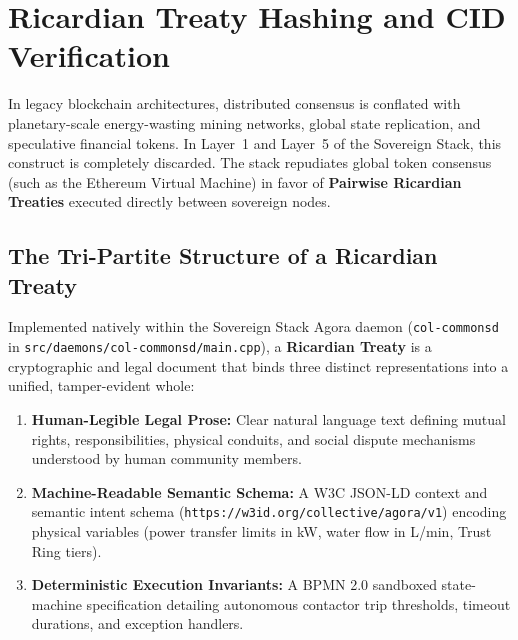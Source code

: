 \begin{enumerate}
\end{enumerate}

\section{Ricardian Treaty Hashing and CID Verification}
\label{sec:ricardian_treaties}

In legacy blockchain architectures, distributed consensus is conflated with planetary-scale energy-wasting mining networks, global state replication, and speculative financial tokens. In Layer~1 and Layer~5 of the Sovereign Stack, this construct is completely discarded. The stack repudiates global token consensus (such as the Ethereum Virtual Machine) in favor of \textbf{Pairwise Ricardian Treaties} executed directly between sovereign nodes.

\subsection{The Tri-Partite Structure of a Ricardian Treaty}
Implemented natively within the Sovereign Stack Agora daemon (\texttt{col-commonsd} in \texttt{src/daemons/col-commonsd/main.cpp}), a \textbf{Ricardian Treaty} is a cryptographic and legal document that binds three distinct representations into a unified, tamper-evident whole:
\begin{enumerate}
    \item \textbf{Human-Legible Legal Prose:} Clear natural language text defining mutual rights, responsibilities, physical conduits, and social dispute mechanisms understood by human community members.
    \item \textbf{Machine-Readable Semantic Schema:} A W3C JSON-LD context and semantic intent schema (\texttt{https://w3id.org/collective/agora/v1}) encoding physical variables (power transfer limits in kW, water flow in L/min, Trust Ring tiers).
    \item \textbf{Deterministic Execution Invariants:} A BPMN 2.0 sandboxed state-machine specification detailing autonomous contactor trip thresholds, timeout durations, and exception handlers.
\end{enumerate}

